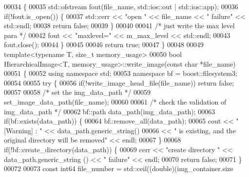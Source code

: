 \begin{DoxyCode}
00034         \{
00035                 std::ofstream fout(file\_name, std::ios::out | std::ios::app);
00036                 \textcolor{keywordflow}{if}(!fout.is\_open()) \{
00037                         std::cerr << \textcolor{stringliteral}{"open "} << file\_name << \textcolor{stringliteral}{" failure"} << 
      std::endl;
00038                         \textcolor{keywordflow}{return} \textcolor{keyword}{false};
00039                 \}
00040 
00041                 \textcolor{comment}{/* just write the max level para */}
00042                 fout << \textcolor{stringliteral}{"maxlevel="} << m\_max\_level << std::endl;
00043                 fout.close();
00044         \}
00045 
00046         \textcolor{keywordflow}{return} \textcolor{keyword}{true};
00047 \}
00048 
00049 \textcolor{keyword}{template}<\textcolor{keyword}{typename} T, \textcolor{keywordtype}{size\_t} memory\_usage>
00050 \textcolor{keywordtype}{bool} HierarchicalImage<T, memory_usage>::write_image(\textcolor{keyword}{const} \textcolor{keywordtype}{char} *file\_name)
00051 \{
00052         \textcolor{keyword}{using namespace }std;
00053         \textcolor{keyword}{namespace }bf = boost::filesystem3;
00054 
00055         \textcolor{keywordflow}{try} \{
00056                 \textcolor{keywordflow}{if}(!write\_image\_head\_file(file\_name))   \textcolor{keywordflow}{return} \textcolor{keyword}{false};
00057 
00058                 \textcolor{comment}{/* set the img\_data\_path */}
00059                 set\_image\_data\_path(file\_name);
00060 
00061                 \textcolor{comment}{/* check the validation of img\_data\_path */}
00062                 bf::path data\_path(img\_data\_path);
00063                 \textcolor{keywordflow}{if}(bf::exists(data\_path)) \{
00064                         bf::remove\_all(data\_path);
00065                         cout << \textcolor{stringliteral}{"[Warning] : "} << data\_path.generic\_string() 
00066                                 << \textcolor{stringliteral}{" is existing, and the original directory
       will be removed"} << endl;
00067                 \}
00068                 \textcolor{keywordflow}{if}(!bf::create\_directory(data\_path)) \{
00069                         cerr << \textcolor{stringliteral}{"create directory "} << data\_path.generic\_string
      () << \textcolor{stringliteral}{" failure"} << endl;
00070                         \textcolor{keywordflow}{return} \textcolor{keyword}{false};
00071                 \}
00072 
00073                 \textcolor{keyword}{const} int64 file\_number = std::ceil((\textcolor{keywordtype}{double})(img\_container.size

\end{DoxyCode}
